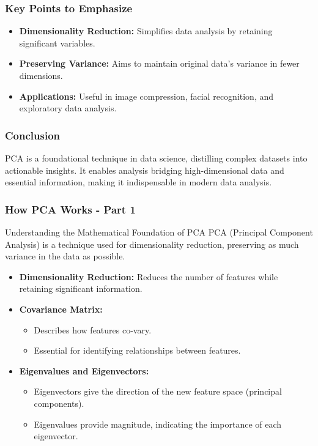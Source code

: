 \documentclass[aspectratio=169]{beamer}
\begin{document}
\begin{frame}[fragile]
    \frametitle{Key Points to Emphasize}
    \begin{itemize}
        \item \textbf{Dimensionality Reduction:} Simplifies data analysis by retaining significant variables.
        \item \textbf{Preserving Variance:} Aims to maintain original data's variance in fewer dimensions.
        \item \textbf{Applications:} Useful in image compression, facial recognition, and exploratory data analysis.
    \end{itemize}
\end{frame}

\begin{frame}[fragile]
    \frametitle{Conclusion}
    PCA is a foundational technique in data science, distilling complex datasets into actionable insights. It enables analysis bridging high-dimensional data and essential information, making it indispensable in modern data analysis.
\end{frame}

\begin{frame}[fragile]
    \frametitle{How PCA Works - Part 1}
    
    \begin{block}{Understanding the Mathematical Foundation of PCA}
        PCA (Principal Component Analysis) is a technique used for dimensionality reduction, preserving as much variance in the data as possible.
    \end{block}
    
    \begin{itemize}
        \item \textbf{Dimensionality Reduction:} 
        Reduces the number of features while retaining significant information.
        
        \item \textbf{Covariance Matrix:} 
        \begin{itemize}
            \item Describes how features co-vary.
            \item Essential for identifying relationships between features.
        \end{itemize}
        
        \item \textbf{Eigenvalues and Eigenvectors:} 
        \begin{itemize}
            \item Eigenvectors give the direction of the new feature space (principal components).
            \item Eigenvalues provide magnitude, indicating the importance of each eigenvector.
        \end{itemize}
    \end{itemize}
\end{frame}
\end{document}
